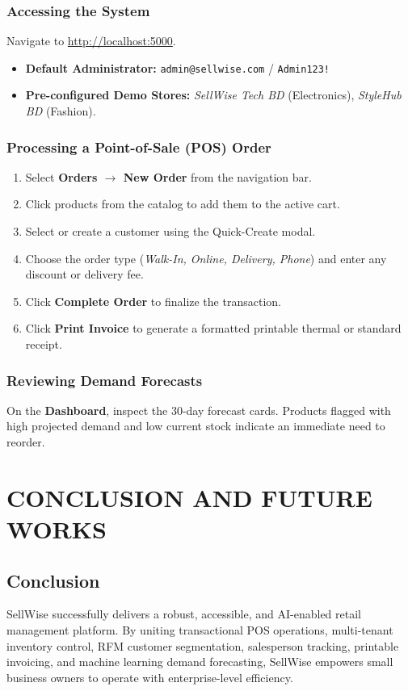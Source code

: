 \documentclass[12pt,a4paper]{report}
\begin{document}
\subsection{Accessing the System}
Navigate to \url{http://localhost:5000}.
\begin{itemize}
    \item \textbf{Default Administrator:} \texttt{admin@sellwise.com} / \texttt{Admin123!}
    \item \textbf{Pre-configured Demo Stores:} \textit{SellWise Tech BD} (Electronics), \textit{StyleHub BD} (Fashion).
\end{itemize}

\subsection{Processing a Point-of-Sale (POS) Order}
\begin{enumerate}
    \item Select \textbf{Orders $\rightarrow$ New Order} from the navigation bar.
    \item Click products from the catalog to add them to the active cart.
    \item Select or create a customer using the Quick-Create modal.
    \item Choose the order type (\textit{Walk-In, Online, Delivery, Phone}) and enter any discount or delivery fee.
    \item Click \textbf{Complete Order} to finalize the transaction.
    \item Click \textbf{Print Invoice} to generate a formatted printable thermal or standard receipt.
\end{enumerate}

\subsection{Reviewing Demand Forecasts}
On the \textbf{Dashboard}, inspect the 30-day forecast cards. Products flagged with high projected demand and low current stock indicate an immediate need to reorder.

\chapter{CONCLUSION AND FUTURE WORKS}

\section{Conclusion}
SellWise successfully delivers a robust, accessible, and AI-enabled retail management platform. By uniting transactional POS operations, multi-tenant inventory control, RFM customer segmentation, salesperson tracking, printable invoicing, and machine learning demand forecasting, SellWise empowers small business owners to operate with enterprise-level efficiency.
\end{document}
